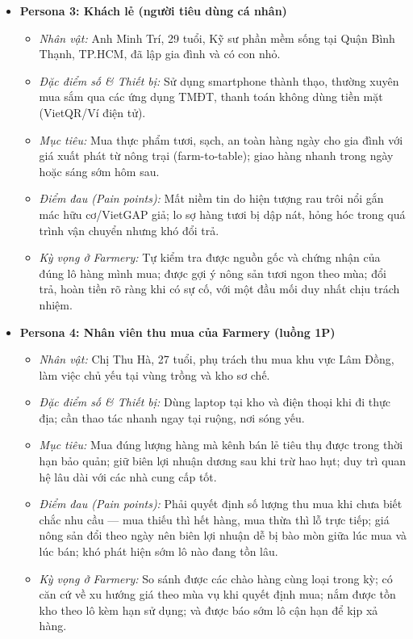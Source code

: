 \begin{itemize}
    \item \textbf{Persona 3: Khách lẻ (người tiêu dùng cá nhân)}
    \begin{itemize}
        \item \textit{Nhân vật:} Anh Minh Trí, 29 tuổi, Kỹ sư phần mềm sống tại Quận Bình Thạnh, TP.HCM, đã lập gia đình và có con nhỏ.
        \item \textit{Đặc điểm số \& Thiết bị:} Sử dụng smartphone thành thạo, thường xuyên mua sắm qua các ứng dụng TMĐT, thanh toán không dùng tiền mặt (VietQR/Ví điện tử).
        \item \textit{Mục tiêu:} Mua thực phẩm tươi, sạch, an toàn hàng ngày cho gia đình với giá xuất phát từ nông trại (farm-to-table); giao hàng nhanh trong ngày hoặc sáng sớm hôm sau.
        \item \textit{Điểm đau (Pain points):} Mất niềm tin do hiện tượng rau trôi nổi gắn mác hữu cơ/VietGAP giả; lo sợ hàng tươi bị dập nát, hỏng hóc trong quá trình vận chuyển nhưng khó đổi trả.
        \item \textit{Kỳ vọng ở Farmery:} Tự kiểm tra được nguồn gốc và chứng nhận của đúng lô hàng mình mua; được gợi ý nông sản tươi ngon theo mùa; đổi trả, hoàn tiền rõ ràng khi có sự cố, với một đầu mối duy nhất chịu trách nhiệm.
    \end{itemize}

    \item \textbf{Persona 4: Nhân viên thu mua của Farmery (luồng 1P)}
    \begin{itemize}
        \item \textit{Nhân vật:} Chị Thu Hà, 27 tuổi, phụ trách thu mua khu vực Lâm Đồng, làm việc chủ yếu tại vùng trồng và kho sơ chế.
        \item \textit{Đặc điểm số \& Thiết bị:} Dùng laptop tại kho và điện thoại khi đi thực địa; cần thao tác nhanh ngay tại ruộng, nơi sóng yếu.
        \item \textit{Mục tiêu:} Mua đúng lượng hàng mà kênh bán lẻ tiêu thụ được trong thời hạn bảo quản; giữ biên lợi nhuận dương sau khi trừ hao hụt; duy trì quan hệ lâu dài với các nhà cung cấp tốt.
        \item \textit{Điểm đau (Pain points):} Phải quyết định số lượng thu mua khi chưa biết chắc nhu cầu --- mua thiếu thì hết hàng, mua thừa thì lỗ trực tiếp; giá nông sản đổi theo ngày nên biên lợi nhuận dễ bị bào mòn giữa lúc mua và lúc bán; khó phát hiện sớm lô nào đang tồn lâu.
        \item \textit{Kỳ vọng ở Farmery:} So sánh được các chào hàng cùng loại trong kỳ; có căn cứ về xu hướng giá theo mùa vụ khi quyết định mua; nắm được tồn kho theo lô kèm hạn sử dụng; và được báo sớm lô cận hạn để kịp xả hàng.
    \end{itemize}
\end{itemize}

